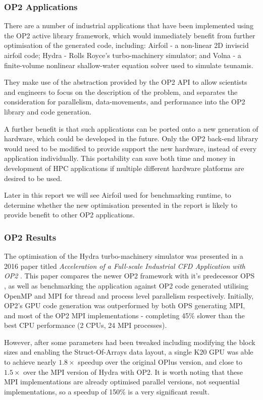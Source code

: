 \subsubsection{OP2 Applications}
There are a number of industrial applications that have been implemented using the OP2 active library framework, which would immediately benefit from further optimisation of the generated code, including: Airfoil \cite{airfoil} - a non-linear 2D inviscid airfoil code; Hydra \cite{hydra} - Rolls Royce’s turbo-machinery simulator; and Volna \cite{volna} - a finite-volume nonlinear shallow-water equation solver used to simulate tsunamis.
\par
They make use of the abstraction provided by the OP2 API to allow scientists and engineers to focus on the description of the problem, and separates the consideration for parallelism, data-movements, and performance into the OP2 library and code generation.
\par
A further benefit is that such applications can be ported onto a new generation of hardware, which could be developed in the future. Only the OP2 back-end library would need to be modified to provide support the new hardware, instead of every application individually. This portability can save both time and money in development of HPC applications if multiple different hardware platforms are desired to be used.
\par
Later in this report we will see Airfoil used for benchmarking runtime, to determine whether the new optimisation presented in the report is likely to provide benefit to other OP2 applications.

\subsubsection{OP2 Results}
The optimisation of the Hydra turbo-machinery simulator was presented in a 2016 paper titled \textit{Acceleration of a Full-scale Industrial CFD Application with OP2} \cite{hydrapaper}. This paper compares the newer OP2 framework with it's predecessor OPS \cite{ops}, as well as benchmarking the application against OP2 code generated utilising OpenMP \cite{OpenMP} and MPI \cite{MPI} for thread and process level parallelism respectively. Initially, OP2's GPU code generation was outperformed by both OPS generating MPI, and most of the OP2 MPI implementations - completing 45\% slower than the best CPU performance (2 CPUs, 24 MPI processes).
\par However, after some parameters had been tweaked including modifying the block sizes and enabling the Struct-Of-Arrays data layout, a single K20 GPU was able to achieve nearly $1.8\times$ speedup over the original OPlus version, and close to $1.5\times$ over the MPI version of Hydra with OP2. It is worth noting that these MPI implementations are already optimised parallel versions, not sequential implementations, so a speedup of 150\% is a very significant result.
\clearpage

